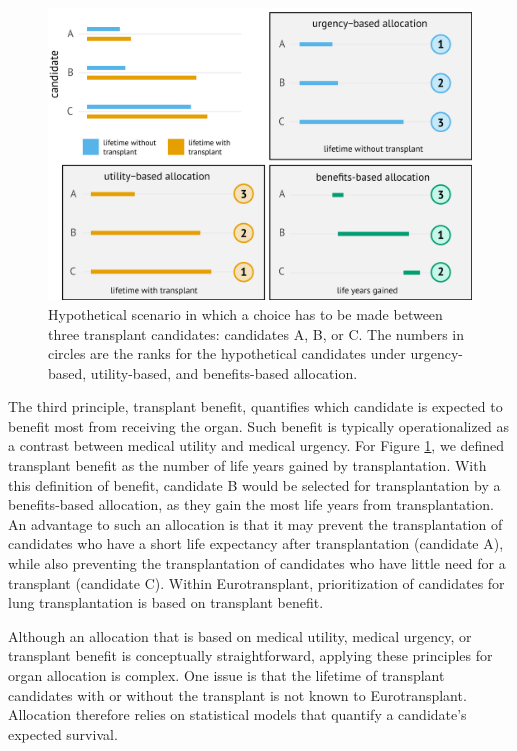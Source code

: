 \documentclass[11pt,twoside,]{book}
\begin{document}
\begin{figure}[h]

{\centering \includegraphics[width=0.95\linewidth]{figures/ch1//fig1-allocation_principles} 

}

\caption{Hypothetical scenario in which a choice has to be made between three
  transplant candidates: candidates A, B, or C. The numbers in circles
  are the ranks for the hypothetical candidates under urgency-based,
  utility-based, and benefits-based allocation.}\label{fig:ch1fig1}
\end{figure}

The third principle, transplant benefit, quantifies which candidate is expected
to benefit most from receiving the organ. Such benefit is typically operationalized
as a contrast between medical utility and medical urgency. For Figure \ref{fig:ch1fig1},
we defined transplant benefit as the number of life years gained by transplantation.
With this definition of benefit, candidate B would be selected for transplantation
by a benefits-based allocation, as they gain the most life years from
transplantation. An
advantage to such an allocation is that it may prevent the transplantation of candidates
who have a short life expectancy after transplantation (candidate A), while
also preventing the transplantation of candidates
who have little need for a transplant (candidate C). Within Eurotransplant, prioritization of candidates for lung transplantation is based on transplant benefit.

Although an allocation that is based on medical utility, medical urgency, or
transplant benefit is conceptually straightforward, applying these principles
for organ allocation is complex. One issue is that the lifetime of transplant
candidates with or without the transplant is not known to Eurotransplant. Allocation
therefore relies on statistical models that quantify a candidate's expected
survival.
\end{document}
